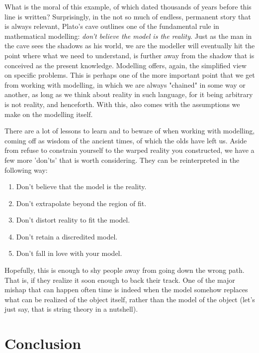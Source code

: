 What is the moral of this example, of which dated thousands of years before this line is written? Surprisingly, in the not so much of endless, permanent story that is always relevant, Plato's cave outlines one of the fundamental rule in mathematical modelling: \textit{don't believe the model is the reality}. Just as the man in the cave sees the shadows as his world, we are the modeller will eventually hit the point where what we need to understand, is further away from the shadow that is conceived as the present knowledge. Modelling offers, again, the simplified view on specific problems. This is perhaps one of the more important point that we get from working with modelling, in which we are always "chained" in some way or another, as long as we think about reality in such language, for it being arbitrary is not reality, and henceforth. With this, also comes with the assumptions we make on the modelling itself. 

There are a lot of lessons to learn and to beware of when working with modelling, coming off as wisdom of the ancient times, of which the olds have left us. Aside from refuse to constrain yourself to the warped reality you constructed, we have a few more 'don'ts' that is worth considering. They can be reinterpreted in the following way:
\begin{axiom}\hfill\break
    \begin{enumerate}[topsep=0pt,itemsep=1pt]
        \item Don't believe that the model is the reality. 
        \item Don't extrapolate beyond the region of fit. 
        \item Don't distort reality to fit the model. 
        \item Don't retain a discredited model. 
        \item Don't fall in love with your model. 
    \end{enumerate}
\end{axiom}
Hopefully, this is enough to shy people away from going down the wrong path. That is, if they realize it soon enough to back their track. One of the major mishap that can happen often time is indeed when the model somehow replaces what can be realized of the object itself, rather than the model of the object (let's just say, that is string theory in a nutshell). 

\section{Conclusion}

